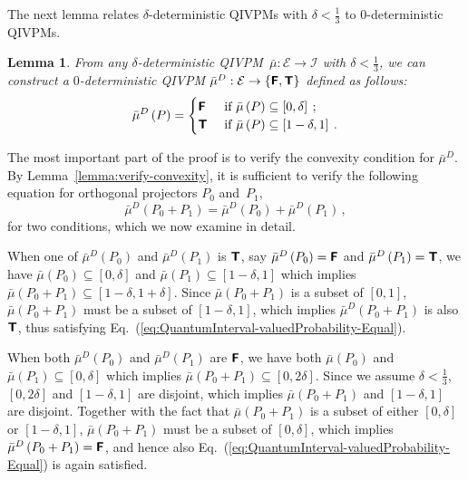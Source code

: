\documentclass[english,reprint, aps, prl,superscriptaddress, showpacs,
showkeys, longbibliography, amsmath, amssymb, floatfix]{revtex4-1}
\theoremstyle{plain}
\newtheorem{lemma}{Lemma}
\theoremstyle{definition}
\newcommand{\events}{\ensuremath{\mathcal{E}}}
\newcommand{\interval}[1]{{\normalfont\textsf{\textbf{#1}}}}
\newcommand{\imposs}{\interval{F}}
\newcommand{\necess}{\interval{T}}
\begin{document}
The next lemma relates $\delta$-deterministic QIVPMs with $\delta <
\frac{1}{3}$ to 0-deterministic QIVPMs. 

\begin{lemma}\label{lemma:delta2zero} 
  From any $\delta$-deterministic
  QIVPM~$\bar{\mu}:\events\rightarrow\mathscr{I}$ with
  $\delta < \frac{1}{3}$, we can construct a $0$-deterministic QIVPM
  $\bar{\mu}^{D}:\events\rightarrow\left\{
    \imposs,\necess\right\}$ defined as follows:
\begin{equation}
\bar{\mu}^{D}\left(P\right)=\begin{cases}
\imposs & \textrm{ if }\bar{\mu}\left(P\right)\subseteq\left[0,\delta\right]\:;\\
\necess & \textrm{ if }\bar{\mu}\left(P\right)\subseteq\left[1-\delta,1\right]\:.
\end{cases}
\end{equation}
\end{lemma}
\noindent The most important part of the proof is to verify the convexity
condition for $\bar{\mu}^{D}$. By Lemma~\ref{lemma:verify-convexity}, it is sufficient
to verify the following equation for orthogonal projectors $P_{0}$
and~$P_{1}$,
\begin{equation}
\bar{\mu}^{D}\left(P_{0}+P_{1}\right)=\bar{\mu}^{D}\left(P_{0}\right)+\bar{\mu}^{D}\left(P_{1}\right)\,, \label{eq:QuantumInterval-valuedProbability-Equal}
\end{equation}
for two conditions, which we now examine in detail.

When one of $\bar{\mu}^{D}\left(P_{0}\right)$ and $\bar{\mu}^{D}\left(P_{1}\right)$
is $\necess$, say $\bar{\mu}^{D}\left(P_{0}\right)=\imposs$
and $\bar{\mu}^{D}\left(P_{1}\right)=\necess$, we have $\bar{\mu}\left(P_{0}\right)\subseteq\left[0,\delta\right]$
and $\bar{\mu}\left(P_{1}\right)\subseteq\left[1-\delta,1\right]$ which
implies $\bar{\mu}\left(P_{0}+P_{1}\right)\subseteq\left[1-\delta,1+\delta\right]$.
Since $\bar{\mu}\left(P_{0}+P_{1}\right)$ is a subset of $\left[0,1\right]$,
$\bar{\mu}\left(P_{0}+P_{1}\right)$ must be a subset of $\left[1-\delta,1\right]$,
which implies $\bar{\mu}^{D}\left(P_{0}+P_{1}\right)$ is also
$\necess$, thus satisfying Eq.~(\ref{eq:QuantumInterval-valuedProbability-Equal}).

When both
$\bar{\mu}^{D}\left(P_{0}\right)$ and $\bar{\mu}^{D}\left(P_{1}\right)$
are $\imposs$, we have both $\bar{\mu}\left(P_{0}\right)$ and
$\bar{\mu}\left(P_{1}\right)\subseteq\left[0,\delta\right]$ which
implies
$\bar{\mu}\left(P_{0}+P_{1}\right)\subseteq\left[0,2\delta\right]$.
Since we assume $\delta<\frac{1}{3}$, $\left[0,2\delta\right]$ and
$\left[1-\delta,1\right]$ are disjoint, which implies
$\bar{\mu}\left(P_{0}+P_{1}\right)$ and $\left[1-\delta,1\right]$ are
disjoint. Together with the fact that
$\bar{\mu}\left(P_{0}+P_{1}\right)$ is a subset of either
$\left[0,\delta\right]$ or $\left[1-\delta,1\right]$,
$\bar{\mu}\left(P_{0}+P_{1}\right)$ must be a subset of
$\left[0,\delta\right]$, which implies
$\bar{\mu}^{D}\left(P_{0}+P_{1}\right)=\imposs$, and hence
also Eq.~(\ref{eq:QuantumInterval-valuedProbability-Equal}) is again satisfied.
\end{document}
